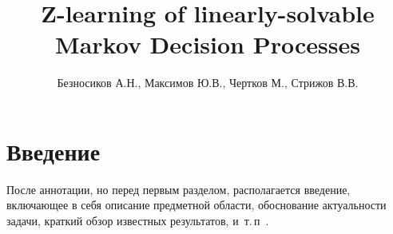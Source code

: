 \documentclass[12pt,twoside]{article}
\title
    [Z-learning of linearly-solvable Markov Decision Processes] %
    {Z-learning of linearly-solvable Markov Decision Processes}
\author
    [Безносиков А.Н.] %
    {Безносиков А.Н., Максимов Ю.В., Чертков М., Стрижов В.В.} %
    [Aleksandr Beznosikov$^1$, Yury Maximov, Michael Chertkov, Vadim Strijov]
\begin{document}
\maketitle

\section{Введение}
После аннотации, но перед первым разделом,
располагается введение, включающее в себя
описание предметной области,
обоснование актуальности задачи,
краткий обзор известных результатов,
и~т.\,п~\cite{Chertkov, Todorov,Szepesvari,Allen}.



\end{document}
